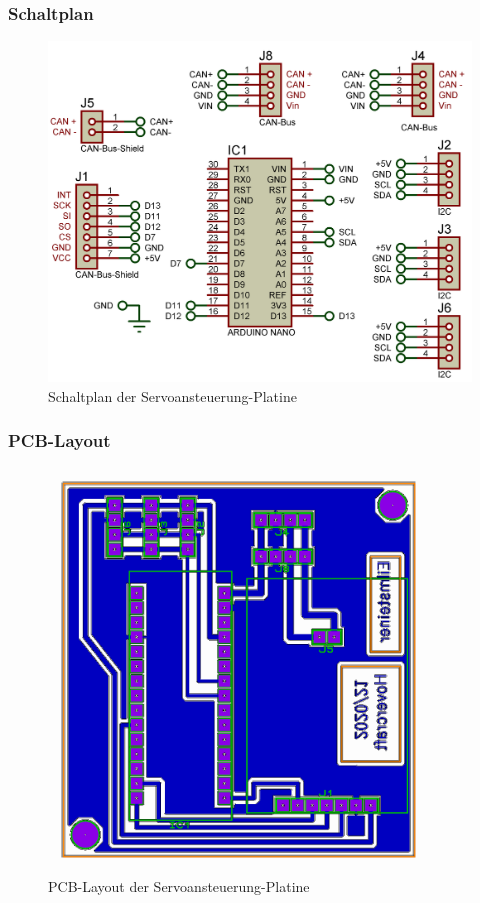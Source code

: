 \newpage
\subsubsection{Schaltplan}
\begin{figure}[h]
    \centering
    \includegraphics[width=1.0\textwidth]{../Proteus/Exports/Servos-Platine.png}    
    \caption{Schaltplan der Servoansteuerung-Platine}
\end{figure}

\newpage
\subsubsection{PCB-Layout}
\begin{figure}[h]
    \centering
    \includegraphics[width=0.9\textwidth]{../Proteus/Exports/Servos-Platine-PCB.png}    
    \caption{PCB-Layout der Servoansteuerung-Platine}
\end{figure}

